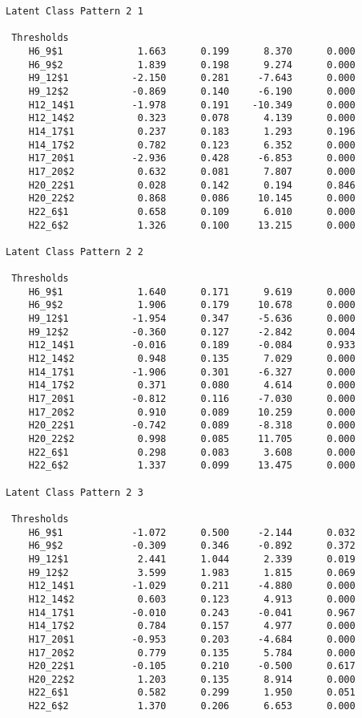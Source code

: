 \documentclass[]{article}
\begin{document}
\begin{verbatim}
Latent Class Pattern 2 1

 Thresholds
    H6_9$1             1.663      0.199      8.370      0.000
    H6_9$2             1.839      0.198      9.274      0.000
    H9_12$1           -2.150      0.281     -7.643      0.000
    H9_12$2           -0.869      0.140     -6.190      0.000
    H12_14$1          -1.978      0.191    -10.349      0.000
    H12_14$2           0.323      0.078      4.139      0.000
    H14_17$1           0.237      0.183      1.293      0.196
    H14_17$2           0.782      0.123      6.352      0.000
    H17_20$1          -2.936      0.428     -6.853      0.000
    H17_20$2           0.632      0.081      7.807      0.000
    H20_22$1           0.028      0.142      0.194      0.846
    H20_22$2           0.868      0.086     10.145      0.000
    H22_6$1            0.658      0.109      6.010      0.000
    H22_6$2            1.326      0.100     13.215      0.000

Latent Class Pattern 2 2

 Thresholds
    H6_9$1             1.640      0.171      9.619      0.000
    H6_9$2             1.906      0.179     10.678      0.000
    H9_12$1           -1.954      0.347     -5.636      0.000
    H9_12$2           -0.360      0.127     -2.842      0.004
    H12_14$1          -0.016      0.189     -0.084      0.933
    H12_14$2           0.948      0.135      7.029      0.000
    H14_17$1          -1.906      0.301     -6.327      0.000
    H14_17$2           0.371      0.080      4.614      0.000
    H17_20$1          -0.812      0.116     -7.030      0.000
    H17_20$2           0.910      0.089     10.259      0.000
    H20_22$1          -0.742      0.089     -8.318      0.000
    H20_22$2           0.998      0.085     11.705      0.000
    H22_6$1            0.298      0.083      3.608      0.000
    H22_6$2            1.337      0.099     13.475      0.000

Latent Class Pattern 2 3

 Thresholds
    H6_9$1            -1.072      0.500     -2.144      0.032
    H6_9$2            -0.309      0.346     -0.892      0.372
    H9_12$1            2.441      1.044      2.339      0.019
    H9_12$2            3.599      1.983      1.815      0.069
    H12_14$1          -1.029      0.211     -4.880      0.000
    H12_14$2           0.603      0.123      4.913      0.000
    H14_17$1          -0.010      0.243     -0.041      0.967
    H14_17$2           0.784      0.157      4.977      0.000
    H17_20$1          -0.953      0.203     -4.684      0.000
    H17_20$2           0.779      0.135      5.784      0.000
    H20_22$1          -0.105      0.210     -0.500      0.617
    H20_22$2           1.203      0.135      8.914      0.000
    H22_6$1            0.582      0.299      1.950      0.051
    H22_6$2            1.370      0.206      6.653      0.000


\end{verbatim}
\end{document}
